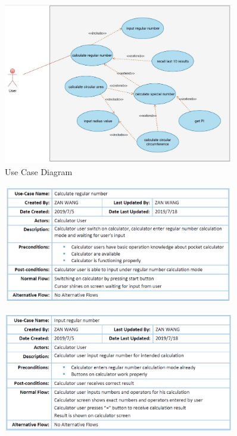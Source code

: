 \begin{figure}[H]
\centering  %
\includegraphics[width=0.9\textwidth]{images/use_case_for_all.jpg}
\caption{Use Case Diagram}
\end{figure}


\begin{figure}[H]
\centering  %
\includegraphics[width=0.9\textwidth]{images/use_case/UC_crn.PNG}
\end{figure}

\begin{figure}[H]
\centering  %
\includegraphics[width=0.9\textwidth]{images/use_case/UC_irn.PNG}
\end{figure}


